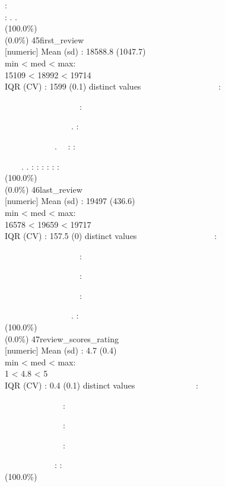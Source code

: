 \documentclass[
  journal,
]{IEEEtran}%
\begin{document}
:\\
: . . \\
(100.0\%) \\
(0.0\%) \textbar{} \textbar{} 45\textbar first\_review\\
{[}numeric{]} \textbar Mean (sd) : 18588.8 (1047.7)\\
min \textless{} med \textless{} max:\\
15109 \textless{} 18992 \textless{} 19714\\
IQR (CV) : 1599 (0.1)  distinct values \textbar{}
\textbar~~~~~~~~~~~~~~~~~~:\\
\strut ~~~~~~~~~~~~~~~~~~:\\
\strut ~~~~~~~~~~~~~~~~. :\\
\strut ~~~~~~~~~~~~. ~~: :\\
\strut ~~~~. . : : : : : : \\
(100.0\%) \\
(0.0\%) \textbar{} \textbar{} 46\textbar last\_review\\
{[}numeric{]} \textbar Mean (sd) : 19497 (436.6)\\
min \textless{} med \textless{} max:\\
16578 \textless{} 19659 \textless{} 19717\\
IQR (CV) : 157.5 (0)  distinct values \textbar{}
\textbar~~~~~~~~~~~~~~~~~~:\\
\strut ~~~~~~~~~~~~~~~~~~:\\
\strut ~~~~~~~~~~~~~~~~~~:\\
\strut ~~~~~~~~~~~~~~~~~~:\\
\strut ~~~~~~~~~~~~~~~~. : \\
(100.0\%) \\
(0.0\%) \textbar{} \textbar{} 47\textbar review\_scores\_rating\\
{[}numeric{]} \textbar Mean (sd) : 4.7 (0.4)\\
min \textless{} med \textless{} max:\\
1 \textless{} 4.8 \textless{} 5\\
IQR (CV) : 0.4 (0.1)  distinct values \textbar{}
\textbar~~~~~~~~~~~~~~:\\
\strut ~~~~~~~~~~~~~~:\\
\strut ~~~~~~~~~~~~~~:\\
\strut ~~~~~~~~~~~~~~:\\
\strut ~~~~~~~~~~~~: : \\
(100.0\%) \\
\end{document}
